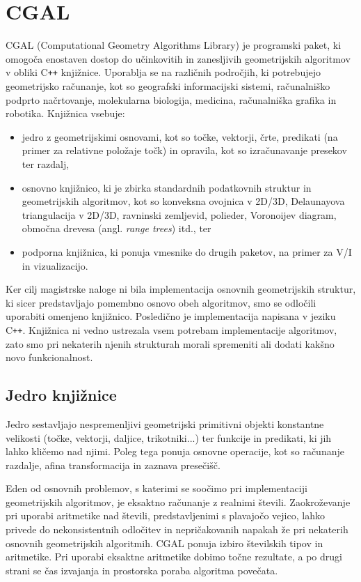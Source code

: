 \documentclass[a4paper, 12pt]{book}
\begin{document}
\section{CGAL}
CGAL (Computational Geometry Algorithms Library) je programski paket, ki omogoča enostaven dostop do učinkovitih in zanesljivih geometrijskih algoritmov v obliki C\texttt{+}\texttt{+} knjižnice. Uporablja se na različnih področjih, ki potrebujejo geometrijsko računanje, kot so geografski informacijski sistemi, računalniško podprto načrtovanje, molekularna biologija, medicina, računalniška grafika in robotika. Knjižnica vsebuje:

\begin{itemize}
\item jedro z geometrijskimi osnovami, kot so točke, vektorji, črte, predikati (na primer za relativne položaje točk) in opravila, kot so izračunavanje presekov ter razdalj,
\item osnovno knjižnico, ki je zbirka standardnih podatkovnih struktur in geometrijskih algoritmov, kot so konveksna ovojnica v 2D/3D, Delaunayova triangulacija v 2D/3D, ravninski zemljevid, polieder, Voronoijev diagram, območna drevesa (angl. \textit{range trees}) itd., ter
\item podporna knjižnica, ki ponuja vmesnike do drugih paketov, na primer za V/I in vizualizacijo.
\end{itemize}

Ker cilj magistrske naloge ni bila implementacija osnovnih geometrijskih struktur, ki sicer predstavljajo pomembno osnovo obeh algoritmov, smo se odločili uporabiti omenjeno knjižnico. Posledično je implementacija napisana v jeziku C\texttt{+}\texttt{+}. Knjižnica ni vedno ustrezala vsem potrebam implementacije algoritmov, zato smo pri nekaterih njenih strukturah morali spremeniti ali dodati kakšno novo funkcionalnost. 

\subsection{Jedro knjižnice}
Jedro sestavljajo nespremenljivi geometrijski primitivni objekti konstantne velikosti (točke, vektorji, daljice, trikotniki...) ter funkcije in predikati, ki jih lahko kličemo nad njimi. Poleg tega ponuja osnovne operacije, kot so računanje razdalje, afina transformacija in zaznava presečišč. 

Eden od osnovnih problemov, s katerimi se soočimo pri implementaciji geometrijskih algoritmov, je eksaktno računanje z realnimi števili. Zaokroževanje pri uporabi aritmetike nad števili, predstavljenimi s plavajočo vejico, lahko privede do nekonsistentnih odločitev in nepričakovanih napakah že pri nekaterih osnovnih geometrijskih algoritmih. CGAL ponuja izbiro številskih tipov in aritmetike. Pri uporabi eksaktne aritmetike dobimo točne rezultate, a po drugi strani se čas izvajanja in prostorska poraba algoritma povečata.
\end{document}
